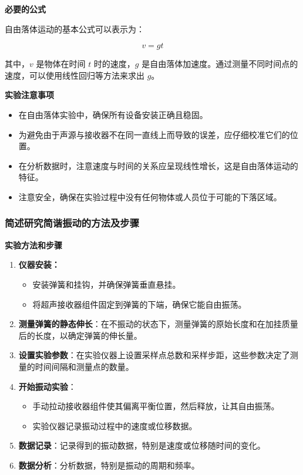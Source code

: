 \documentclass[dvipsnames, svgnames,a4paper,11pt]{article}
\begin{document}
	\textbf{必要的公式}
	
	自由落体运动的基本公式可以表示为：
	
	\[ v = gt \]
	
	其中，\( v \) 是物体在时间 \( t \) 时的速度，\( g \) 是自由落体加速度。通过测量不同时间点的速度，可以使用线性回归等方法来求出 \( g \)。
	
	\textbf{实验注意事项}
	
	\begin{itemize}
		\item 在自由落体实验中，确保所有设备安装正确且稳固。
		\item 为避免由于声源与接收器不在同一直线上而导致的误差，应仔细校准它们的位置。
		\item 在分析数据时，注意速度与时间的关系应呈现线性增长，这是自由落体运动的特征。
		\item 注意安全，确保在实验过程中没有任何物体或人员位于可能的下落区域。
	\end{itemize}
	
	\subsubsection{简述研究简谐振动的方法及步骤}
	\textbf{实验方法和步骤}
	
	\begin{enumerate}
		\item \textbf{仪器安装：}
		\begin{itemize}
			\item 安装弹簧和挂钩，并确保弹簧垂直悬挂。
			\item 将超声接收器组件固定到弹簧的下端，确保它能自由振荡。
		\end{itemize}
		
		\item \textbf{测量弹簧的静态伸长}：在不振动的状态下，测量弹簧的原始长度和在加挂质量后的长度，以确定弹簧的伸长量。
		
		\item \textbf{设置实验参数}：在实验仪器上设置采样点总数和采样步距，这些参数决定了测量的时间间隔和测量点的数量。		
		
		\item \textbf{开始振动实验}：
		\begin{itemize}
			\item 手动拉动接收器组件使其偏离平衡位置，然后释放，让其自由振荡。
			\item 实验仪器记录振动过程中的速度或位移数据。
		\end{itemize}
		
		\item \textbf{数据记录}：记录得到的振动数据，特别是速度或位移随时间的变化。
		
		\item \textbf{数据分析}：分析数据，特别是振动的周期和频率。
		
	\end{enumerate}
	
\end{document}
